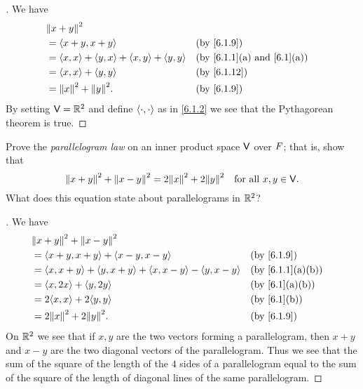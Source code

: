 \begin{proof}[]
  We have
  \begin{align*}
     & \norm{x + y}^2                                                                                         \\
     & = \inn{x + y, x + y}                                &  & \text{(by \cref{6.1.9})}                      \\
     & = \inn{x, x} + \inn{y, x} + \inn{x, y} + \inn{y, y} &  & \text{(by \cref{6.1.1}(a) and \cref{6.1}(a))} \\
     & = \inn{x, x} + \inn{y, y}                           &  & \text{(by \cref{6.1.12})}                     \\
     & = \norm{x}^2 + \norm{y}^2.                          &  & \text{(by \cref{6.1.9})}
  \end{align*}
  By setting \(\mathsf{V} = \mathbb{R}^2\) and define \(\left\langle\cdot, \cdot\right\rangle\) as in \cref{6.1.2} we see that the Pythagorean theorem is true.
\end{proof}

\begin{ex}\label{ex:6.1.11}
  Prove the \emph{parallelogram law} on an inner product space \(\mathsf{V}\) over \(\mathit{F}\);
  that is, show that
  \[
    \norm{x + y}^2 + \norm{x - y}^2 = 2 \norm{x}^2 + 2 \norm{y}^2 \quad \text{for all } x, y \in \V.
  \]
  What does this equation state about parallelograms in \(\mathbb{R}^2\)?
\end{ex}

\begin{proof}[]
  We have
  \begin{align*}
     & \norm{x + y}^2 + \norm{x - y}^2                                                                         \\
     & = \inn{x + y, x + y} + \inn{x - y, x - y}                           &  & \text{(by \cref{6.1.9})}       \\
     & = \inn{x, x + y} + \inn{y, x + y} + \inn{x, x - y} - \inn{y, x - y} &  & \text{(by \cref{6.1.1}(a)(b))} \\
     & = \inn{x, 2x} + \inn{y, 2y}                                         &  & \text{(by \cref{6.1}(a)(b))}   \\
     & = 2 \inn{x, x} + 2 \inn{y, y}                                       &  & \text{(by \cref{6.1}(b))}      \\
     & = 2 \norm{x}^2 + 2 \norm{y}^2.                                      &  & \text{(by \cref{6.1.9})}
  \end{align*}
  On \(\mathbb{R}^2\) we see that if \(x, y\) are the two vectors forming a parallelogram, then \(x + y\) and \(x - y\) are the two diagonal vectors of the parallelogram.
  Thus we see that the sum of the square of the length of the \(4\) sides of a parallelogram equal to the sum of the square of the length of diagonal lines of the same parallelogram.
\end{proof}

